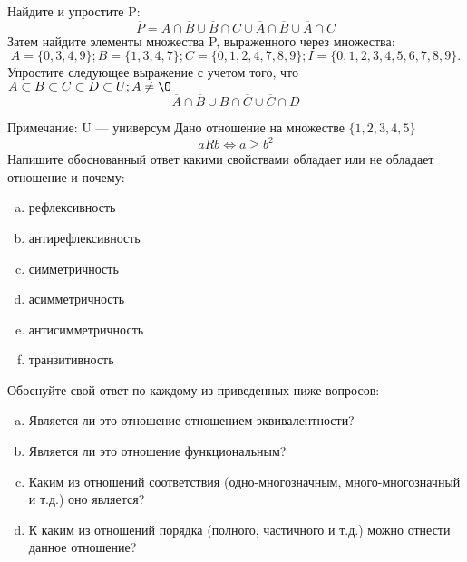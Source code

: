 \documentclass[10pt]{exam}
\begin{document}
\begin{questions}
\question
Найдите и упростите P:
\begin{equation*}
\overline{P} = A \cap \overline{B} \cup \overline{B} \cap C \cup \overline{A} \cap \overline{B} \cup \overline{A} \cap C
\end{equation*}
Затем найдите элементы множества P, выраженного через множества:
\begin{equation*}
A = \{0, 3, 4, 9\}; 
B = \{1, 3, 4, 7\};
C = \{0, 1, 2, 4, 7, 8, 9\};
I = \{0, 1, 2, 3, 4, 5, 6, 7, 8, 9\}.
\end{equation*}\question
Упростите следующее выражение с учетом того, что $A\subset B \subset C \subset D \subset U; A \neq \O$
\begin{equation*}
\overline{A} \cap \overline{B} \cup B \cap \overline{C} \cup \overline{C} \cap D
\end{equation*}

Примечание: U — универсум\question
Дано отношение на множестве $\{1, 2, 3, 4, 5\}$ 
\begin{equation*}
aRb \iff a \geq b^2
\end{equation*}
Напишите обоснованный ответ какими свойствами обладает или не обладает отношение и почему:   
\begin{enumerate} [a)]\setcounter{enumi}{0}
\item рефлексивность
\item антирефлексивность
\item симметричность
\item асимметричность
\item антисимметричность
\item транзитивность
\end{enumerate}

Обоснуйте свой ответ по каждому из приведенных ниже вопросов:
\begin{enumerate} [a)]\setcounter{enumi}{0}
    \item Является ли это отношение отношением эквивалентности?
    \item Является ли это отношение функциональным?
    \item Каким из отношений соответствия (одно-многозначным, много-многозначный и т.д.) оно является?
    \item К каким из отношений порядка (полного, частичного и т.д.) можно отнести данное отношение?
\end{enumerate}



\end{questions}
\end{document}
